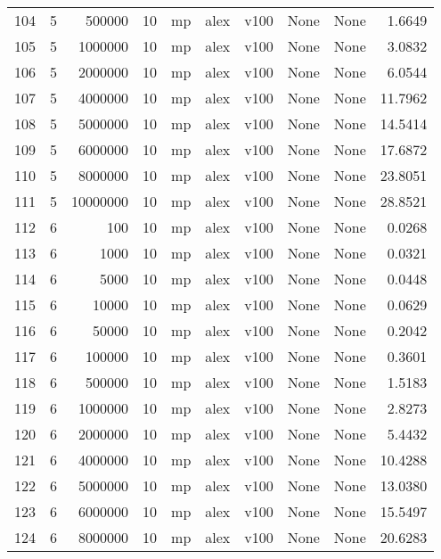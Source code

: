 \begin{tabular}{lrrrlllllr}
104 &   5 &    500000 &      10 &   mp &  alex &  v100 &  None &  None &   1.6649 \\
105 &   5 &   1000000 &      10 &   mp &  alex &  v100 &  None &  None &   3.0832 \\
106 &   5 &   2000000 &      10 &   mp &  alex &  v100 &  None &  None &   6.0544 \\
107 &   5 &   4000000 &      10 &   mp &  alex &  v100 &  None &  None &  11.7962 \\
108 &   5 &   5000000 &      10 &   mp &  alex &  v100 &  None &  None &  14.5414 \\
109 &   5 &   6000000 &      10 &   mp &  alex &  v100 &  None &  None &  17.6872 \\
110 &   5 &   8000000 &      10 &   mp &  alex &  v100 &  None &  None &  23.8051 \\
111 &   5 &  10000000 &      10 &   mp &  alex &  v100 &  None &  None &  28.8521 \\
112 &   6 &       100 &      10 &   mp &  alex &  v100 &  None &  None &   0.0268 \\
113 &   6 &      1000 &      10 &   mp &  alex &  v100 &  None &  None &   0.0321 \\
114 &   6 &      5000 &      10 &   mp &  alex &  v100 &  None &  None &   0.0448 \\
115 &   6 &     10000 &      10 &   mp &  alex &  v100 &  None &  None &   0.0629 \\
116 &   6 &     50000 &      10 &   mp &  alex &  v100 &  None &  None &   0.2042 \\
117 &   6 &    100000 &      10 &   mp &  alex &  v100 &  None &  None &   0.3601 \\
118 &   6 &    500000 &      10 &   mp &  alex &  v100 &  None &  None &   1.5183 \\
119 &   6 &   1000000 &      10 &   mp &  alex &  v100 &  None &  None &   2.8273 \\
120 &   6 &   2000000 &      10 &   mp &  alex &  v100 &  None &  None &   5.4432 \\
121 &   6 &   4000000 &      10 &   mp &  alex &  v100 &  None &  None &  10.4288 \\
122 &   6 &   5000000 &      10 &   mp &  alex &  v100 &  None &  None &  13.0380 \\
123 &   6 &   6000000 &      10 &   mp &  alex &  v100 &  None &  None &  15.5497 \\
124 &   6 &   8000000 &      10 &   mp &  alex &  v100 &  None &  None &  20.6283 \\

\end{tabular}
